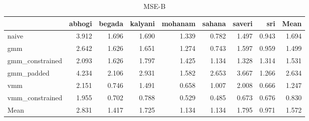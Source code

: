 \begin{table}
\caption{MSE-B}
\label{tab:mseB}
\begin{tabular}{lrrrrrrrr}
\toprule
 & abhogi & begada & kalyani & mohanam & sahana & saveri & sri & Mean \\
\midrule
naive & 3.912 & 1.696 & 1.690 & 1.339 & 0.782 & 1.497 & 0.943 & 1.694 \\
gmm & 2.642 & 1.626 & 1.651 & 1.274 & 0.743 & 1.597 & 0.959 & 1.499 \\
gmm_constrained & 2.093 & 1.626 & 1.797 & 1.425 & 1.134 & 1.328 & 1.314 & 1.531 \\
gmm_padded & 4.234 & 2.106 & 2.931 & 1.582 & 2.653 & 3.667 & 1.266 & 2.634 \\
vmm & 2.151 & 0.746 & 1.491 & 0.658 & 1.007 & 2.008 & 0.666 & 1.247 \\
vmm_constrained & 1.955 & 0.702 & 0.788 & 0.529 & 0.485 & 0.673 & 0.676 & 0.830 \\
Mean & 2.831 & 1.417 & 1.725 & 1.134 & 1.134 & 1.795 & 0.971 & 1.572 \\
\bottomrule
\end{tabular}
\end{table}
